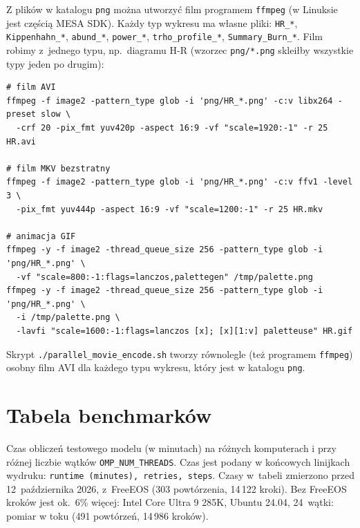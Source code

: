 \documentclass[11pt,a4paper]{article}
\begin{document}
Z plików w katalogu \texttt{png} można utworzyć film programem \texttt{ffmpeg} (w Linuksie jest
częścią MESA SDK). Każdy typ wykresu ma własne pliki: \texttt{HR\_*}, \texttt{Kippenhahn\_*},
\texttt{abund\_*}, \texttt{power\_*}, \texttt{trho\_profile\_*}, \texttt{Summary\_Burn\_*}. Film
robimy z~jednego typu, np.~diagramu H-R (wzorzec \verb!png/*.png! skleiłby wszystkie typy jeden po
drugim):
\begin{verbatim}
# film AVI
ffmpeg -f image2 -pattern_type glob -i 'png/HR_*.png' -c:v libx264 -preset slow \
  -crf 20 -pix_fmt yuv420p -aspect 16:9 -vf "scale=1920:-1" -r 25 HR.avi

# film MKV bezstratny
ffmpeg -f image2 -pattern_type glob -i 'png/HR_*.png' -c:v ffv1 -level 3 \
  -pix_fmt yuv444p -aspect 16:9 -vf "scale=1200:-1" -r 25 HR.mkv

# animacja GIF
ffmpeg -y -f image2 -thread_queue_size 256 -pattern_type glob -i 'png/HR_*.png' \
  -vf "scale=800:-1:flags=lanczos,palettegen" /tmp/palette.png
ffmpeg -y -f image2 -thread_queue_size 256 -pattern_type glob -i 'png/HR_*.png' \
  -i /tmp/palette.png \
  -lavfi "scale=1600:-1:flags=lanczos [x]; [x][1:v] paletteuse" HR.gif
\end{verbatim}
Skrypt \verb!./parallel_movie_encode.sh! tworzy równolegle (też programem \texttt{ffmpeg}) osobny
film AVI dla każdego typu wykresu, który jest w katalogu \texttt{png}.

\section{Tabela benchmarków}\label{sec:bench}

Czas obliczeń testowego modelu (w minutach) na różnych komputerach i przy różnej liczbie wątków
\texttt{OMP\_NUM\_THREADS}. Czas jest podany w końcowych linijkach wydruku:
\texttt{runtime (minutes), retries, steps}. Czasy w~tabeli zmierzono przed 12~października 2026,
z~FreeEOS (303 powtórzenia, 14\,122 kroki). Bez FreeEOS kroków jest ok.~6\% więcej:
Intel Core Ultra 9 285K, Ubuntu 24.04, 24~wątki: pomiar w toku (491 powtórzeń, 14\,986 kroków).
\end{document}
